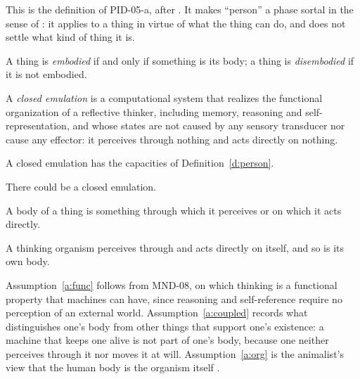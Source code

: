 \documentclass{situationist-preprint}
\begin{document}
This is the definition of PID-05-a, after \citet[II.xxvii.9]{Locke1694}. It makes \enquote{person} a phase sortal in the sense of \citet{Wiggins1980}: it applies to a thing in virtue of what the thing can do, and does not settle what kind of thing it is.

\begin{definition}\label{d:body}
A thing is \emph{embodied} if and only if something is its body; a thing is \emph{disembodied} if it is not embodied.
\end{definition}

\begin{definition}\label{d:closed}
A \emph{closed emulation} is a computational system that realizes the functional organization of a reflective thinker, including memory, reasoning and self-representation, and whose states are not caused by any sensory transducer nor cause any effector: it perceives through nothing and acts directly on nothing.
\end{definition}

\begin{assumption}\label{a:func}
A closed emulation has the capacities of Definition~\ref{d:person}.
\end{assumption}

\begin{assumption}\label{a:poss}
There could be a closed emulation.
\end{assumption}

\begin{assumption}\label{a:coupled}
A body of a thing is something through which it perceives or on which it acts directly.
\end{assumption}

\begin{assumption}\label{a:org}
A thinking organism perceives through and acts directly on itself, and so is its own body.
\end{assumption}

Assumption~\ref{a:func} follows from MND-08, on which thinking is a functional property that machines can have, since reasoning and self-reference require no perception of an external world. Assumption~\ref{a:coupled} records what distinguishes one's body from other things that support one's existence: a machine that keeps one alive is not part of one's body, because one neither perceives through it nor moves it at will. Assumption~\ref{a:org} is the animalist's view that the human body is the organism itself \citep{Olson2007}.
\end{document}
